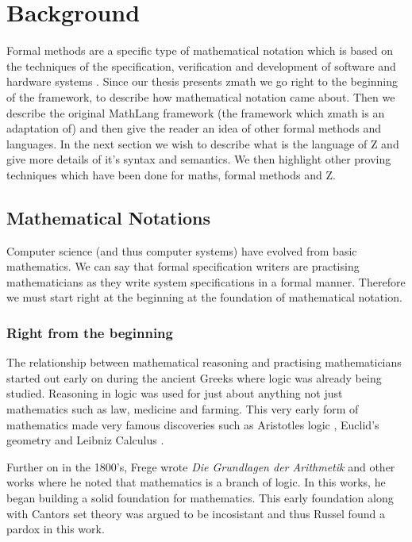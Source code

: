 \chapter{Background}
\label{ch:background}

Formal methods are a specific type of mathematical notation which is based on the techniques of the specification, verification and development of software and hardware systems \cite{whatareformalmethods}. Since our thesis presents \gls{zmath} we go right to the beginning of the framework, to describe how mathematical notation came about. Then we describe the original MathLang framework (the framework which \gls{zmath} is an adaptation of) and then give the reader an idea of other formal methods and languages. In the next section we wish to describe what is the language of Z and give more details of it's syntax and semantics. We then highlight other proving techniques which have been done for maths, formal methods and Z.

\section{Mathematical Notations}

Computer science (and thus computer systems) have evolved from basic mathematics. We can say that formal specification writers are practising mathematicians as they write system specifications in a formal manner. Therefore we must start right at the beginning at the foundation of mathematical notation.

\subsection{Right from the beginning}
\label{subsec:rftb}

The relationship between mathematical reasoning and practising mathematicians started out early on during the ancient Greeks where logic was already being studied. Reasoning in logic was used for just about anything not just mathematics such as law, medicine and farming. This very early form of mathematics made very famous discoveries such as Aristotles logic \cite{aristotle}, Euclid's geometry \cite{euclid} and Leibniz Calculus \cite{leibniz}.

Further on in the 1800's, Frege wrote \emph{Die Grundlagen der Arithmetik} \cite{frege} and other works where he noted that mathematics is a branch of logic. In this works, he began building a solid foundation for mathematics. This early foundation along with Cantors set theory \cite{cantor} was argued to be incosistant and thus Russel found a pardox in this work.

